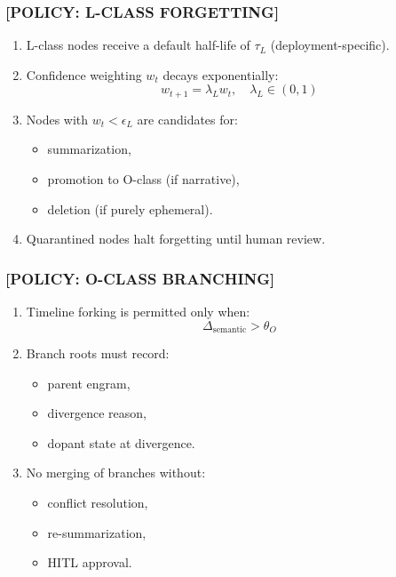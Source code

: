 \subsubsection*{[POLICY: L-CLASS FORGETTING]}

\begin{enumerate}
    \item L-class nodes receive a default half-life of $\tau_L$ (deployment-specific).
    \item Confidence weighting $w_t$ decays exponentially:
    \[
        w_{t+1} = \lambda_L w_t, \quad \lambda_L \in (0,1)
    \]
    \item Nodes with $w_t < \epsilon_L$ are candidates for:
    \begin{itemize}
        \item summarization,
        \item promotion to O-class (if narrative),
        \item deletion (if purely ephemeral).
    \end{itemize}
    \item Quarantined nodes halt forgetting until human review.
\end{enumerate}

\subsubsection*{[POLICY: O-CLASS BRANCHING]}

\begin{enumerate}
    \item Timeline forking is permitted only when:
    \[
        \Delta_{\text{semantic}} > \theta_O
    \]
    \item Branch roots must record:
    \begin{itemize}
        \item parent engram,
        \item divergence reason,
        \item dopant state at divergence.
    \end{itemize}
    \item No merging of branches without:
    \begin{itemize}
        \item conflict resolution,
        \item re-summarization,
        \item HITL approval.
    \end{itemize}
\end{enumerate}

